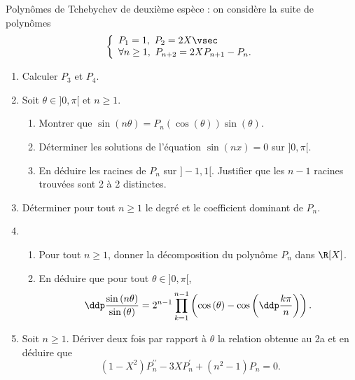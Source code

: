 \documentclass[a4paper, 11pt,reqno]{article}
\begin{document}
\begin{exercice}  \; Polyn\^omes de Tchebychev de deuxi\`{e}me esp\`ece : on consid\`ere la suite de polyn\^omes
	$$\left\lbrace\begin{array}{l}
			P_1=1,\ P_2=2X\vsec \\
			\forall n\geq 1,\ P_{n+2}=2XP_{n+1}-P_n.
		\end{array}\right.$$
	\begin{enumerate}
		\item Calculer $P_3$ et $P_4$.
		\item Soit $\theta\in\rbrack 0,\pi\lbrack$ et $n\geq 1$.
		      \begin{enumerate}
			      \item Montrer que $\sin{(n\theta)}=P_n(\cos{(\theta)})\sin{(\theta)}$.
			      \item D\'eterminer les solutions de l'\'equation $\sin{(nx)}=0$ sur $\rbrack 0,\pi\lbrack$.
			      \item En d\'eduire les racines de $P_n$ sur $\rbrack -1,1\lbrack$. Justifier que les $n-1$ racines trouv\'ees sont 2 \`a 2 distinctes.
		      \end{enumerate}
		\item D\'eterminer pour tout $n\geq 1$ le degr\'e et le coefficient dominant de $P_n$.
		\item
		      \begin{enumerate}
			      \item Pour tout $n\geq 1$, donner la d\'ecomposition du polyn\^ome $P_n$ dans $\R\lbrack X\rbrack$.
			      \item En d\'eduire que pour tout $\theta\in\rbrack 0,\pi\lbrack$,
			            $$\ddp\frac{\sin{(n\theta)}}{\sin{(\theta)}}=2^{n-1}\prod\limits_{k=1}^{n-1}\left( \cos{(\theta)}-\cos{\left( \ddp\frac{k\pi}{n}\right) } \right).$$
		      \end{enumerate}
		\item Soit $n\geq 1$. D\'eriver deux fois par rapport \`a $\theta$ la relation obtenue au 2a et en d\'eduire que
		      $$(1-X^2)P^{\prime\prime}_n-3XP_n^{\prime}+(n^2-1)P_n=0.$$
	\end{enumerate}
\end{exercice}
\end{document}

